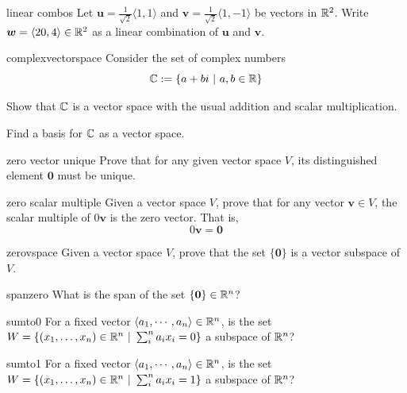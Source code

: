     \begin{problem}{linear combos}
    Let $\bm{u} = \frac{1}{\sqrt{2}}\langle 1, 1 \rangle$ and $\bm{v} = \frac{1}{\sqrt{2}}\langle 1, -1 \rangle$ be vectors in $\mathbb{R}^2$.  Write $\bm{w} = \langle 20, 4 \rangle \in \mathbb{R}^2$ as a linear combination of $\bm{u}$ and $\bm{v}$.
    \end{problem}
    
    
    \begin{problem}{complexvectorspace}
Consider the set of complex numbers $$\mathbb{C} := \{ a + bi \ | \ a, b \in \mathbb{R}\}$$ 

\begin{subproblems}
\item Show that $\mathbb{C}$ is a vector space with the usual addition and scalar multiplication.
\item Find a basis for $\mathbb{C}$ as a vector space.
\end{subproblems}

\end{problem}


\begin{problem}{zero vector unique}
Prove that for any given vector space $V$, its distinguished element $\bm{0}$ must be unique.
\end{problem}

\begin{problem}{zero scalar multiple}
Given a vector space $V$, prove that for any vector $\bm{v} \in V$, the scalar multiple of $0\bm{v}$ is the zero vector.  That is,
$$0\bm{v} = \bm{0}$$
\end{problem}

\begin{problem}{zerovspace}
Given a vector space $V$, prove that the set $\{\bm{0}\}$ is a vector subspace of $V$.
\end{problem}



\begin{problem}{spanzero}
    What is the span of the set $\{\bm{0}\} \in \mathbb{R}^n$?
\end{problem}


\begin{problem}{sumto0}
For a fixed vector $\langle a_1, \cdots, a_n \rangle \in \mathbb{R}^n$, is the set $W = \{(x_1, \dots, x_n) \in \R^n \ | \ \sum^n_i a_ix_i = 0 \}$ a subspace of $\mathbb{R}^n$?
\end{problem}

\begin{problem}{sumto1}
For a fixed vector $\langle a_1, \cdots, a_n \rangle \in \mathbb{R}^n$, is the set $W = \{(x_1, \dots, x_n) \in \R^n \ | \ \sum^n_i a_ix_i = 1 \}$ a subspace of $\mathbb{R}^n$?
\end{problem}

